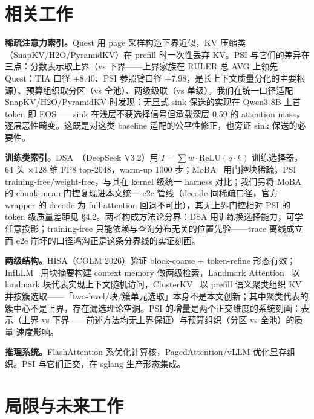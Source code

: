 \documentclass[11pt]{article}
\begin{document}
\section{相关工作}

\textbf{稀疏注意力索引。}Quest 用 page 采样构造下界近似，KV 压缩类（SnapKV/H2O/PyramidKV）在 prefill 时一次性丢弃 KV。PSI 与它们的差异在三点：分数表示取上界（vs 下界——上界家族在 RULER 总 AVG 上领先 Quest：TIA 口径 $+8.40$、PSI 参照臂口径 $+7.98$，是长上下文质量分化的主要根源）、预算组织取分区（vs 全池）、两级级联（vs 单级）。我们在统一口径适配 SnapKV/H2O/PyramidKV 时发现：无显式 sink 保送的实现在 Qwen3-8B 上首 token 即 EOS——sink 在浅层不获选择信号但承载深层 0.59 的 attention mass，逐层恶性畸变。这既是对这类 baseline 适配的公平性修正，也旁证 sink 保送的必要性。

\textbf{训练类索引。}DSA~\cite{dsa}（DeepSeek V3.2）用 $I=\sum w\cdot\mathrm{ReLU}(q\cdot k)$ 训练选择器，64 头 $\times$128 维 FP8 top-2048，warm-up 1000 步；MoBA~\cite{moba} 用门控块稀疏。PSI training-free/weight-free，与其在 kernel 级统一 harness 对比；我们另将 MoBA 的 chunk-mean 门控复现进本文统一 e2e 管线（decode 同稀疏口径，官方 wrapper 的 decode 为 full-attention 回退不可比），其无上界门控相对 PSI 的 token 级质量差距见 §4.2。两者构成方法论分界：DSA 用训练换选择能力，可学任意投影；training-free 只能依赖与查询分布无关的位置先验——trace 离线成立而 e2e 崩坏的口径鸿沟正是这条分界线的实证刻画。

\textbf{两级结构。}HISA（COLM 2026）验证 block-coarse + token-refine 形态有效；InfLLM~\cite{infllm} 用块摘要构建 context memory 做两级检索，Landmark Attention~\cite{landmark} 以 landmark 块代表实现上下文随机访问，ClusterKV~\cite{clusterkv} 以 prefill 语义聚类组织 KV 并按簇选取——「two-level/块/簇单元选取」本身不是本文创新；其中聚类代表的簇中心不是上界，存在漏选理论空洞。PSI 的增量是两个正交维度的系统刻画：表示（上界 vs 下界——前述方法均无上界保证）与预算组织（分区 vs 全池）的质量-速度影响。

\textbf{推理系统。}FlashAttention 系优化计算核，PagedAttention/vLLM 优化显存组织。PSI 与它们正交，在 sglang 生产形态集成。

\section{局限与未来工作}
\end{document}
